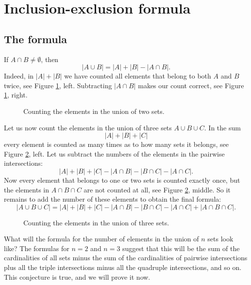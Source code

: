 \section{Inclusion-exclusion formula}
\subsection{The formula}
If $A \cap B \ne \emptyset$, then
\[
|A \cup B| = |A| + |B| - |A \cap B|.
\]
Indeed, in $|A|+|B|$ we have counted all elements that belong to both $A$ and $B$ twice, see Figure \ref{fig:IncExc2}, left.
Subtracting $|A \cap B|$ makes our count correct, see Figure \ref{fig:IncExc2}, right.

\begin{figure}[ht]
\begin{center}

\end{center}
\caption{Counting the elements in the union of two sets.}
\label{fig:IncExc2}
\end{figure}

Let us now count the elements in the union of three sets $A \cup B \cup C$.
In the sum
\[
|A| + |B| + |C|
\]
every element is counted as many times as to how many sets it belongs, see Figure \ref{fig:IncExc3}, left.
Let us subtract the numbers of the elements in the pairwise intersections:
\[
|A| + |B| + |C| - |A \cap B| - |B \cap C| - |A \cap C|.
\]
Now every element that belongs to one or two sets is counted exactly once,
but the elements in $A \cap B \cap C$ are not counted at all, see Figure \ref{fig:IncExc3}, middle.
So it remains to add the number of these elements to obtain the final formula:
\[
|A \cup B \cup C| = |A| + |B| + |C| - |A \cap B| - |B \cap C| - |A \cap C| + |A \cap B \cap C|.
\]

\begin{figure}[ht]
\begin{center}

\end{center}
\caption{Counting the elements in the union of three sets.}
\label{fig:IncExc3}
\end{figure}

What will the formula for the number of elements in the union of $n$ sets look like?
The formulas for $n=2$ and $n=3$ suggest that this will be the sum of the cardinalities of all sets
minus the sum of the cardinalities of pairwise intersections plus all the triple intersections
minus all the quadruple intersections, and so on.
This conjecture is true, and we will prove it now.
